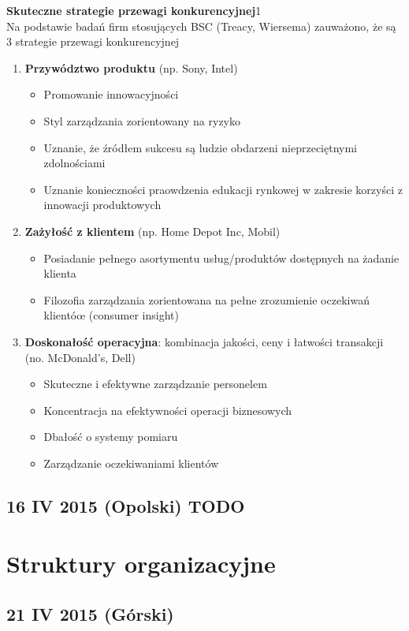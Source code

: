 \documentclass[a4paper,10pt]{report}
\begin{document}
\textbf{Skuteczne strategie przewagi konkurencyjnej}1\\
Na podstawie badań firm stosujących BSC (Treacy, Wiersema) zauważono, że są 3 strategie przewagi konkurencyjnej
\begin{enumerate}
	\item \textbf{Przywództwo produktu} (np. Sony, Intel)
	\begin{itemize}
		\item Promowanie innowacyjności
		\item Styl zarządzania zorientowany na ryzyko
		\item Uznanie, że źródłem sukcesu są ludzie obdarzeni nieprzeciętnymi zdolnościami
		\item Uznanie konieczności praowdzenia edukacji rynkowej w zakresie korzyści z innowacji produktowych
	\end{itemize}
	\item \textbf{Zażyłość z klientem} (np. Home Depot Inc, Mobil)
	\begin{itemize}
		\item Posiadanie pełnego asortymentu usług/produktów dostępnych na żadanie klienta
		\item Filozofia zarządzania zorientowana na pełne zrozumienie oczekiwań klientóœ (consumer insight)
	\end{itemize}
	\item \textbf{Doskonałość operacyjna}: kombinacja jakości, ceny i łatwości transakcji (no. McDonald's, Dell)
	\begin{itemize}
		\item Skuteczne i efektywne zarządzanie personelem
		\item Koncentracja na efektywności operacji biznesowych
		\item Dbałość o systemy pomiaru
		\item Zarządzanie oczekiwaniami klientów
	\end{itemize}
\end{enumerate}

\section{16 IV 2015 (Opolski) TODO}

\chapter{Struktury organizacyjne}
\section{21 IV 2015 (Górski)}
\end{document}
